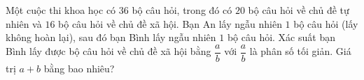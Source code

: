 \begin{ex}
Một cuộc thi khoa học có $36$ bộ câu hỏi, trong đó có $20$ bộ câu hỏi về chủ đề tự nhiên và $16$ bộ câu hỏi về chủ đề xã hội. Bạn An lấy ngẫu nhiên $1$ bộ câu hỏi (lấy không hoàn lại), sau đó bạn Bình lấy ngẫu nhiên $1$ bộ câu hỏi. Xác suất bạn Bình lấy được bộ câu hỏi về chủ đề xã hội bằng $\dfrac ab$ với $\dfrac ab$ là phân số tối giản. Giá trị $a+b$ bằng bao nhiêu?
\end{ex}
